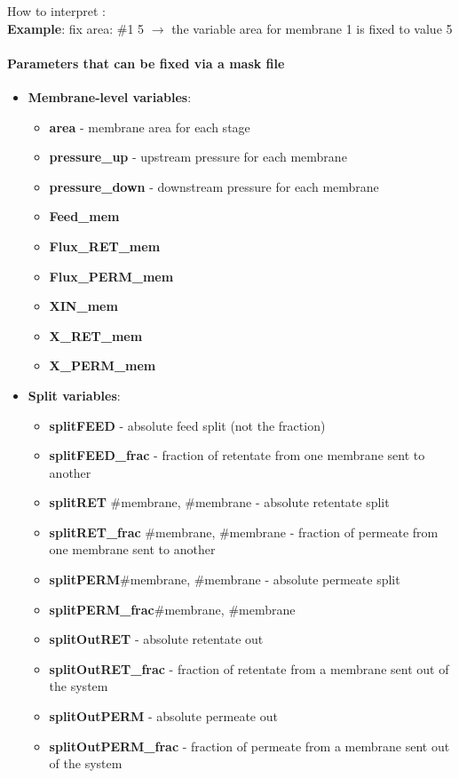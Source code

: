 \documentclass[12pt]{article}
\theoremstyle{definition}
\theoremstyle{definition}
\theoremstyle{remark}
\theoremstyle{remark}
\theoremstyle{definition}
\theoremstyle{remark}
\begin{document}
How to interpret : \\

\textbf{Example}: fix area: \#1 5 $\rightarrow$ the variable area for membrane 1 is fixed to value 5 


\paragraph{Parameters that can be fixed via a mask file}
\begin{itemize}
	
\item \textbf{Membrane-level variables}:
	\begin{itemize}
		
  \item \textbf{area} - membrane area for each stage
  \item \textbf{pressure\_up} - upstream pressure for each membrane
  \item \textbf{pressure\_down} - downstream pressure for each membrane
  \item \textbf{Feed\_mem}
  \item \textbf{Flux\_RET\_mem}
  \item \textbf{Flux\_PERM\_mem}
  \item \textbf{XIN\_mem}
  \item \textbf{X\_RET\_mem}
  \item \textbf{X\_PERM\_mem}
	\end{itemize}

	
\item \textbf{Split variables}:
\begin{itemize}
  \item \textbf{splitFEED} - absolute feed split (not the fraction)
  \item \textbf{splitFEED\_frac} - fraction of retentate from one membrane sent to another
  \item \textbf{splitRET} \#membrane, \#membrane - absolute retentate split
  \item \textbf{splitRET\_frac} \#membrane, \#membrane - fraction of permeate from one membrane sent to another
  \item \textbf{splitPERM}\#membrane, \#membrane - absolute permeate split
  \item \textbf{splitPERM\_frac}\#membrane, \#membrane
  \item \textbf{splitOutRET} - absolute retentate out
  \item \textbf{splitOutRET\_frac} - fraction of retentate from a membrane sent out of the system
  \item \textbf{splitOutPERM} - absolute permeate out
  \item \textbf{splitOutPERM\_frac} - fraction of permeate from a membrane sent out of the system
\end{itemize}


\end{itemize}
\end{document}
